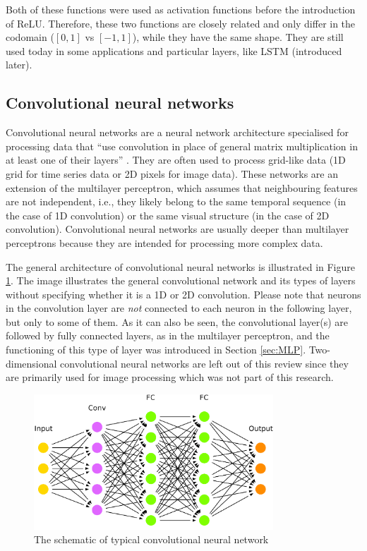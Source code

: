 Both of these functions were used as activation functions before the introduction of ReLU. Therefore, these two functions are closely related and only differ in the codomain ($[0, 1]$ vs $[-1, 1]$), while they have the same shape. They are still used today in some applications and particular layers, like LSTM (introduced later).

\subsection{Convolutional neural networks}

Convolutional neural networks are a neural network architecture specialised for processing data that ``use convolution in place of general matrix multiplication in at least one of their layers'' \cite{Goodfellow2016}. They are often used to process grid-like data (1D grid for time series data or 2D pixels for image data). These networks are an extension of the multilayer perceptron, which assumes that neighbouring features are not independent, i.e., they likely belong to the same temporal sequence (in the case of 1D convolution) or the same visual structure (in the case of 2D convolution). Convolutional neural networks are usually deeper than multilayer perceptrons because they are intended for processing more complex data.

The general architecture of convolutional neural networks is illustrated in Figure \ref{fig:ConvArch}. The image illustrates the general convolutional network and its types of layers without specifying whether it is a 1D or 2D convolution. Please note that neurons in the convolution layer are \emph{not} connected to each neuron in the following layer, but only to some of them. As it can also be seen, the convolutional layer(s) are followed by fully connected layers, as in the multilayer perceptron, and the functioning of this type of layer was introduced in Section \ref{sec:MLP}. Two-dimensional convolutional neural networks are left out of this review since they are primarily used for image processing which was not part of this research.

\begin{figure}
    \centering
    \includegraphics[width=0.8\textwidth]{slike/arch_conv.pdf}
    \caption{The schematic of typical convolutional neural network}
    \label{fig:ConvArch}
\end{figure}

